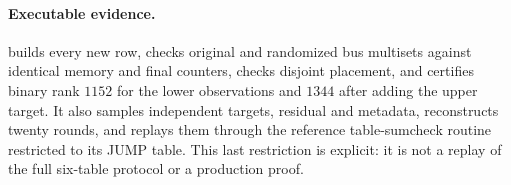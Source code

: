 \documentclass[11pt]{article}
\begin{document}
\paragraph{Executable evidence.}  builds every new row, checks original and randomized bus multisets against identical memory and final counters, checks disjoint placement, and certifies binary rank $1152$ for the lower observations and $1344$ after adding the upper target. It also samples independent targets, residual and metadata, reconstructs twenty rounds, and replays them through the reference table-sumcheck routine restricted to its JUMP table. This last restriction is explicit: it is not a replay of the full six-table protocol or a production proof.
\end{document}
